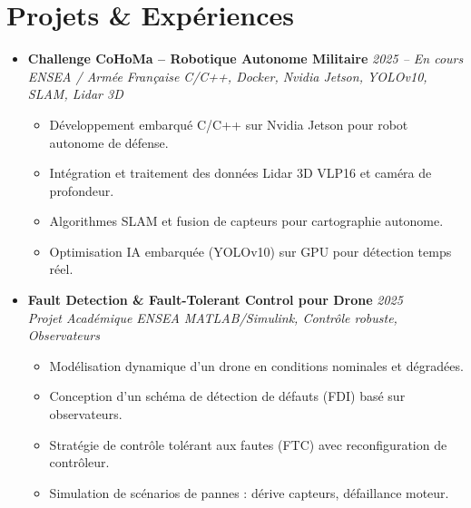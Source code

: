 \documentclass[a4paper,11pt]{article}
\begin{document}
\section{Projets \& Expériences}
\begin{itemize}[leftmargin=*, label={-}]

\item \textbf{Challenge CoHoMa -- Robotique Autonome Militaire} \hfill \textit{2025 -- En cours} \\
\textit{ENSEA / Armée Française} \hfill \textit{C/C++, Docker, Nvidia Jetson, YOLOv10, SLAM, Lidar 3D}
\vspace{-2pt}
    \begin{itemize}[leftmargin=0.4cm, nosep, label=\tiny$\bullet$]
        \item \small{Développement embarqué C/C++ sur Nvidia Jetson pour robot autonome de défense.}
        \item \small{Intégration et traitement des données Lidar 3D VLP16 et caméra de profondeur.}
        \item \small{Algorithmes SLAM et fusion de capteurs pour cartographie autonome.}
        \item \small{Optimisation IA embarquée (YOLOv10) sur GPU pour détection temps réel.}
    \end{itemize}
\vspace{3pt}

\item \textbf{Fault Detection \& Fault-Tolerant Control pour Drone} \hfill \textit{2025} \\
\textit{Projet Académique ENSEA} \hfill \textit{MATLAB/Simulink, Contrôle robuste, Observateurs}
\vspace{-2pt}
    \begin{itemize}[leftmargin=0.4cm, nosep, label=\tiny$\bullet$]
        \item \small{Modélisation dynamique d'un drone en conditions nominales et dégradées.}
        \item \small{Conception d'un schéma de détection de défauts (FDI) basé sur observateurs.}
        \item \small{Stratégie de contrôle tolérant aux fautes (FTC) avec reconfiguration de contrôleur.}
        \item \small{Simulation de scénarios de pannes : dérive capteurs, défaillance moteur.}
    \end{itemize}
\vspace{3pt}


\end{itemize}
\end{document}
